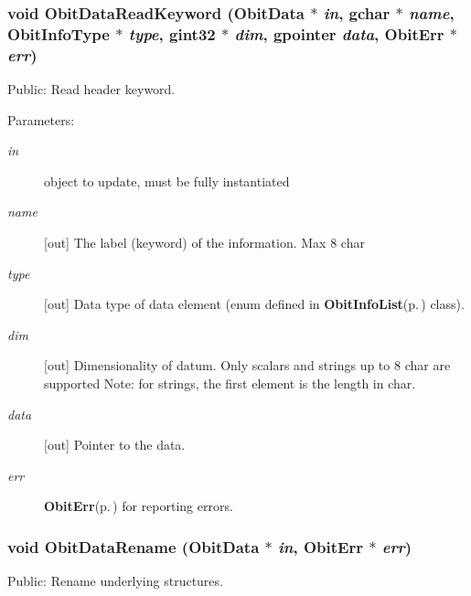 \subsubsection{\setlength{\rightskip}{0pt plus 5cm}void Obit\-Data\-Read\-Keyword ({\bf Obit\-Data} $\ast$ {\em in}, gchar $\ast$ {\em name}, Obit\-Info\-Type $\ast$ {\em type}, gint32 $\ast$ {\em dim}, gpointer {\em data}, {\bf Obit\-Err} $\ast$ {\em err})}\label{ObitData_8h_a48}


Public: Read header keyword. 

\begin{Desc}
\item[Parameters:]
\begin{description}
\item[{\em in}]object to update, must be fully instantiated \item[{\em name}][out] The label (keyword) of the information. Max 8 char \item[{\em type}][out] Data type of data element (enum defined in {\bf Obit\-Info\-List}{\rm (p.\,\pageref{structObitInfoList})} class). \item[{\em dim}][out] Dimensionality of datum. Only scalars and strings up to 8 char are supported Note: for strings, the first element is the length in char. \item[{\em data}][out] Pointer to the data. \item[{\em err}]{\bf Obit\-Err}{\rm (p.\,\pageref{structObitErr})} for reporting errors. \end{description}
\end{Desc}
\subsubsection{\setlength{\rightskip}{0pt plus 5cm}void Obit\-Data\-Rename ({\bf Obit\-Data} $\ast$ {\em in}, {\bf Obit\-Err} $\ast$ {\em err})}\label{ObitData_8h_a32}


Public: Rename underlying structures. 

